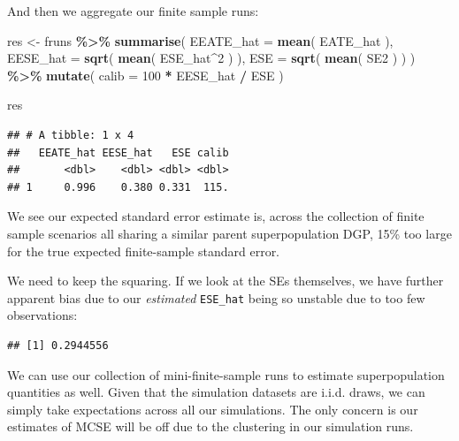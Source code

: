 \documentclass[
]{book}
\newenvironment{Shaded}{\begin{snugshade}}{\end{snugshade}}
\newcommand{\AttributeTok}[1]{\textcolor[rgb]{0.13,0.29,0.53}{#1}}
\newcommand{\DecValTok}[1]{\textcolor[rgb]{0.00,0.00,0.81}{#1}}
\newcommand{\FunctionTok}[1]{\textcolor[rgb]{0.13,0.29,0.53}{\textbf{#1}}}
\newcommand{\NormalTok}[1]{#1}
\newcommand{\OtherTok}[1]{\textcolor[rgb]{0.56,0.35,0.01}{#1}}
\newcommand{\SpecialCharTok}[1]{\textcolor[rgb]{0.81,0.36,0.00}{\textbf{#1}}}
\begin{document}
And then we aggregate our finite sample runs:

\begin{Shaded}
\begin{Highlighting}[]
\NormalTok{res }\OtherTok{\textless{}{-}}\NormalTok{ fruns }\SpecialCharTok{\%\textgreater{}\%}
  \FunctionTok{summarise}\NormalTok{( }\AttributeTok{EEATE\_hat =} \FunctionTok{mean}\NormalTok{( EATE\_hat ),}
             \AttributeTok{EESE\_hat =} \FunctionTok{sqrt}\NormalTok{( }\FunctionTok{mean}\NormalTok{( ESE\_hat}\SpecialCharTok{\^{}}\DecValTok{2}\NormalTok{ ) ),}
             \AttributeTok{ESE =} \FunctionTok{sqrt}\NormalTok{( }\FunctionTok{mean}\NormalTok{( SE2 ) ) ) }\SpecialCharTok{\%\textgreater{}\%}
  \FunctionTok{mutate}\NormalTok{( }\AttributeTok{calib =} \DecValTok{100} \SpecialCharTok{*}\NormalTok{ EESE\_hat }\SpecialCharTok{/}\NormalTok{ ESE )}

\NormalTok{res}
\end{Highlighting}
\end{Shaded}

\begin{verbatim}
## # A tibble: 1 x 4
##   EEATE_hat EESE_hat   ESE calib
##       <dbl>    <dbl> <dbl> <dbl>
## 1     0.996    0.380 0.331  115.
\end{verbatim}

We see our expected standard error estimate is, across the collection of finite sample scenarios all sharing a similar parent superpopulation DGP, 15\% too large for the true expected finite-sample standard error.

We need to keep the squaring. If we look at the SEs themselves, we have further apparent bias due to our \emph{estimated} \texttt{ESE\_hat} being so unstable due to too few observations:

\begin{Shaded}
\end{Shaded}

\begin{verbatim}
## [1] 0.2944556
\end{verbatim}

We can use our collection of mini-finite-sample runs to estimate superpopulation quantities as well.
Given that the simulation datasets are i.i.d. draws, we can simply take expectations across all our simulations.
The only concern is our estimates of MCSE will be off due to the clustering in our simulation runs.
\end{document}
